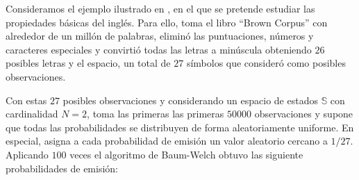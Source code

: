 \begin{exampleth}
Consideramos el ejemplo ilustrado en \cite{Stamp}, en el que se pretende estudiar las propiedades básicas del inglés. Para ello, toma el libro \enquote{Brown Corpus} con alrededor de un millón de palabras, eliminó las puntuaciones, números y caracteres especiales y convirtió todas las letras a minúscula obteniendo $26$ posibles letras y el espacio, un total de $27$ símbolos que consideró como posibles observaciones.

Con estas $27$ posibles observaciones y considerando un espacio de estados $\mathbb{S}$ con cardinalidad $N=2$, toma las primeras las primeras $50000$ observaciones y supone que todas las probabilidades se distribuyen de forma aleatoriamente uniforme. En especial, asigna a cada probabilidad de emisión un valor aleatorio cercano a $1/27$. Aplicando $100$ veces el algoritmo de Baum-Welch obtuvo las siguiente probabilidades de emisión:  



\end{exampleth}
